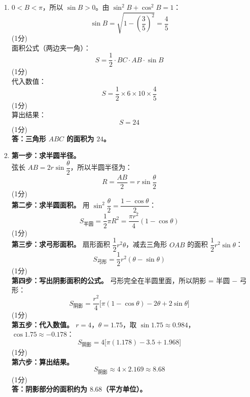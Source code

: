 \documentclass[12pt,a4paper]{exam-zh}
\begin{document}
\begin{solution}
    \begin{enumerate}[label=(\alph*)]
        \item $0 < B < \pi$，所以 $\sin B > 0$。由 $\sin^2 B + \cos^2 B = 1$： \\
        $$\sin B = \sqrt{1 - \left(\frac{3}{5}\right)^2} = \frac{4}{5}$$ \hfill (1分) \\
        面积公式（两边夹一角）： \\
        $$S = \frac{1}{2} \cdot BC \cdot AB \cdot \sin B$$ \hfill (1分) \\
        代入数值： \\
        $$S = \frac{1}{2} \times 6 \times 10 \times \frac{4}{5}$$ \hfill (1分) \\
        算出结果： \\
        $$S = 24$$ \hfill (1分) \\
        \textbf{答：三角形 $ABC$ 的面积为 $24$。}

        \item \textbf{第一步：求半圆半径。} \\
        弦长 $AB = 2r\sin\dfrac{\theta}{2}$，所以半圆半径为： \\
        $$R = \frac{AB}{2} = r\sin\frac{\theta}{2}$$ \hfill (1分) \\
        \textbf{第二步：求半圆面积。} 用 $\sin^2\dfrac{\theta}{2} = \dfrac{1-\cos\theta}{2}$： \\
        $$S_{\text{半圆}} = \frac{1}{2}\pi R^2 = \frac{\pi r^2}{4}(1 - \cos\theta)$$ \hfill (1分) \\
        \textbf{第三步：求弓形面积。} 扇形面积 $\dfrac{1}{2}r^2\theta$，减去三角形 $OAB$ 的面积 $\dfrac{1}{2}r^2\sin\theta$： \\
        $$S_{\text{弓形}} = \frac{1}{2}r^2(\theta - \sin\theta)$$ \hfill (1分) \\
        \textbf{第四步：写出阴影面积的公式。} 弓形完全在半圆里面，所以阴影 = 半圆 $-$ 弓形： \\
        $$S_{\text{阴影}} = \frac{r^2}{4}\Big[\pi(1-\cos\theta) - 2\theta + 2\sin\theta\Big]$$ \hfill (1分) \\
        \textbf{第五步：代入数值。} $r=4$，$\theta=1.75$，取 $\sin 1.75 \approx 0.984$，$\cos 1.75 \approx -0.178$： \\
        $$S_{\text{阴影}} = 4\big[\pi(1.178) - 3.5 + 1.968\big]$$ \hfill (1分) \\
        \textbf{第六步：算出结果。} \\
        $$S_{\text{阴影}} \approx 4 \times 2.169 \approx 8.68$$ \hfill (1分) \\
        \textbf{答：阴影部分的面积约为 $8.68$（平方单位）。}


\end{enumerate}
\end{solution}
\end{document}
